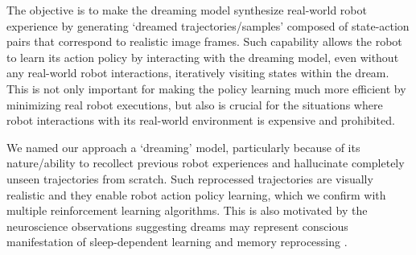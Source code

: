\documentclass[letterpaper, 10 pt, conference]{ieeeconf}
\begin{document}
The objective is to make the dreaming model synthesize real-world robot experience by generating `dreamed trajectories/samples' composed of state-action pairs that correspond to realistic image frames. Such capability allows the robot to learn its action policy by interacting with the dreaming model, even without any real-world robot interactions, iteratively visiting states within the dream. This is not only important for making the policy learning much more efficient by minimizing real robot executions, but also is crucial for the situations where robot interactions with its real-world environment is expensive and prohibited.

We named our approach a `dreaming' model, particularly because of its nature/ability to recollect previous robot experiences and hallucinate completely unseen trajectories from scratch.
Such reprocessed trajectories are visually realistic and they enable robot action policy learning, which we confirm with multiple reinforcement learning algorithms. This is also motivated by the neuroscience observations suggesting dreams may represent conscious manifestation of sleep-dependent learning and memory reprocessing \cite{stickgold2001sleep}.

\end{document}
